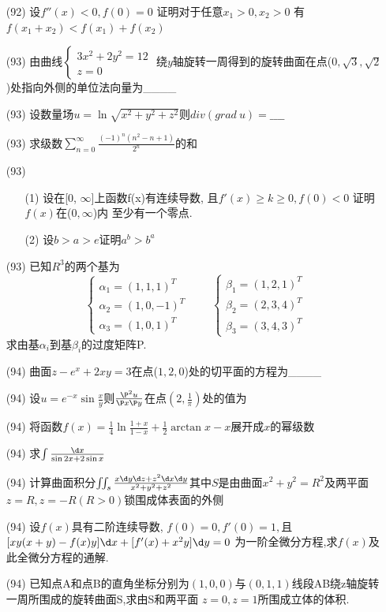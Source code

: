\documentclass[12pt, a4paper, oneside, UTF8]{ctexbook}
\begin{document}
\begin{enumerate}
    \item [(92)] 设$f''(x) < 0, f(0) = 0$ 证明对于任意$x_1 > 0, x_2 > 0$ 有$f(x_1+x_2) < f(x_1) + f(x_2)$ 
    \item [(93)] 由曲线$\begin{cases}
        3x^2 + 2y^2 = 12 \\
        z = 0
    \end{cases}$ 绕$y$轴旋转一周得到的旋转曲面在点($0, \sqrt{3}, \sqrt{2}$)处指向外侧的单位法向量为\_\_\_\_
    \item [(93)]设数量场$u=\ln\sqrt{x^2+y^2+z^2}$则$div(grad\ u) = \_\_\_\_$
    \item [(93)] \bt 求级数$\sum_{n=0}^{\infty}\frac{(-1)^n(n^2-n+1)}{2^n}$的和
    \item [(93)]
    \begin{enumerate}
        \item [(1)] 设在[0, $\infty$]上函数f(x)有连续导数, 且$f'(x)\geq k\geq 0, f(0) < 0$ 证明$f(x)$在($0,\infty$)内
        至少有一个零点. 
        \item [(2)] 设$b>a>e$证明$a^b > b^a$ 
    \end{enumerate}
    \item [(93)] 已知$R^3$的两个基为 
    $$
    \begin{cases}
        \alpha_1 = (1,1,1)^T \\
        \alpha_2 = (1,0,-1)^T \\
        \alpha_3 = (1,0,1)^T
    \end{cases} \qquad
    \begin{cases}
        \beta_1 = (1,2,1)^T \\
        \beta_2 = (2,3,4)^T \\
        \beta_3 = (3,4,3)^T
    \end{cases}
    $$
    求由基$\alpha_i$到基$\beta_i$的过度矩阵P.

    \item [(94)] 曲面$z-e^x+2xy=3$在点($1,2,0$)处的切平面的方程为\_\_\_\_
    \item [(94)] 设$u=e^{-x}\sin\frac{x}{y}$则$\frac{\P^2 u}{\P x\P y}$在点$(2,\frac{1}{\pi})$处的值为 
    \item [(94)] 将函数$f(x)=\frac{1}{4}\ln\frac{1+x}{1-x}+\frac{1}{2}\arctan{x}-x$展开成$x$的幂级数
    \item [(94)] 求$\int \frac{\d x}{\sin {2x} + 2\sin{x}}$
    \item [(94)] 计算曲面积分$\iint_{s}\frac{x\d y\d z + z^2\d x\d y}{x^2+y^2+z^2}$其中$S$是由曲面$x^2+y^2=R^2$及两平面
    $z=R,z=-R(R>0)$锁围成体表面的外侧
    \item [(94)] 设$f(x)$具有二阶连续导数, $f(0)=0, f'(0)=1,$且$[xy(x+y)-f(x)y]\d x + [f'(x)+x^2y]\d y = 0$
    为一阶全微分方程,求$f(x)$及此全微分方程的通解.
    \item [(94)] 已知点A和点B的直角坐标分别为$(1,0,0)$与$(0,1,1)$线段AB绕z轴旋转一周所围成的旋转曲面S,求由S和两平面
    $z=0, z= 1$所围成立体的体积.
    

\end{enumerate}
\end{document}

